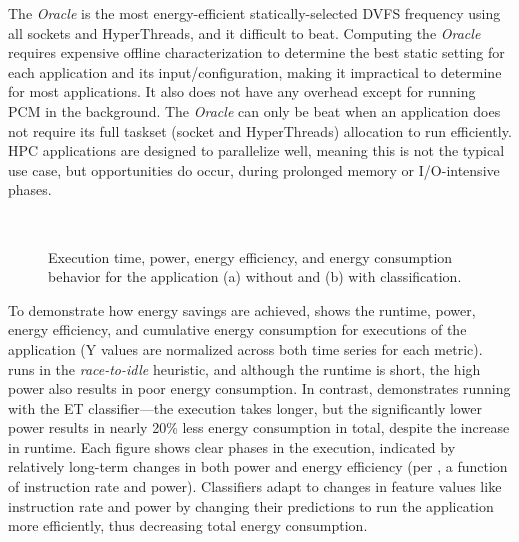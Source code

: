The \emph{Oracle} is the most energy-efficient statically-selected DVFS frequency using all sockets and HyperThreads, and it difficult to beat.
Computing the \emph{Oracle} requires expensive offline characterization to determine the best static setting for each application and its input/configuration, making it impractical to determine for most applications.
It also does not have any overhead except for running PCM in the background.
The \emph{Oracle} can only be beat when an application does not require its full taskset (socket and HyperThreads) allocation to run efficiently.
HPC applications are designed to parallelize well, meaning this is not the typical use case, but opportunities do occur, \eg during prolonged memory or I/O-intensive phases.

\begin{figure}[t]
  \centering
  \subfloat[\app{HipMer} in naive static \emph{race-to-idle} heuristic.]
  {\centering 
  \label{fig:ts-hipmer-dvfs}
  }
  \\
  \subfloat[\app{HipMer} with ET classifier at 5 second intervals.]
  {\centering 
  \label{fig:ts-hipmer-all-et}
  }
  \caption{Execution time, power, energy efficiency, and energy consumption behavior for the  application (a) without and (b) with classification.}
  \label{fig:ts-hipmer}
\end{figure}

To demonstrate how energy savings are achieved,  shows the runtime, power, energy efficiency, and cumulative energy consumption for executions of the  application (Y values are normalized across both time series for each metric).
 runs  in the \emph{race-to-idle} heuristic, and although the runtime is short, the high power also results in poor energy consumption.
In contrast,  demonstrates running with the ET classifier---the execution takes longer, but the significantly lower power results in nearly 20\% less energy consumption in total, despite the increase in runtime.
Each figure shows clear phases in the execution, indicated by relatively long-term changes in both power and energy efficiency (per , a function of instruction rate and power).
Classifiers adapt to changes in feature values like instruction rate and power by changing their predictions to run the application more efficiently, thus decreasing total energy consumption.


